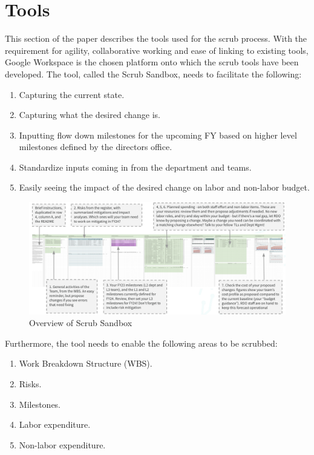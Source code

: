 \section{Tools} \label{sec:tools}

This section of the paper describes the tools used for the scrub process. With the requirement for agility, collaborative working and ease of linking to existing tools, Google Workspace  is the chosen platform onto which the scrub tools have been developed. The tool, called the Scrub Sandbox,  needs to facilitate the following:

\begin{enumerate}
\item Capturing the current state.
\item Capturing what the desired change is.
\item Inputting flow down milestones for the upcoming FY based on higher level milestones defined by the directors office.
\item Standardize inputs coming in from the department and teams.
\item Easily seeing the impact of the desired change on labor and non-labor budget.
\end{enumerate}

\begin{figure}[h!]
\begin{centering}
\includegraphics[width=1.0\textwidth]{Figure3OverviewScrubSandbox}
	\caption{ Overview of Scrub Sandbox
\label{fig:sandbox}}
\end{centering}
\end{figure}

\noindent Furthermore, the tool needs to enable the following areas to be scrubbed:
\begin{enumerate}
\item Work Breakdown Structure (WBS).
\item Risks.
\item Milestones.
\item Labor expenditure.
\item Non-labor expenditure.
\end{enumerate}

